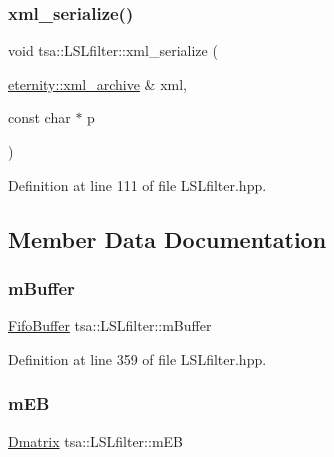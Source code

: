 \subsubsection{\texorpdfstring{xml\+\_\+serialize()}{xml\_serialize()}}
{\footnotesize\ttfamily void tsa\+::\+L\+S\+Lfilter\+::xml\+\_\+serialize (\begin{DoxyParamCaption}\item[{\hyperlink{classeternity_1_1xml__archive}{eternity\+::xml\+\_\+archive} \&}]{xml,  }\item[{const char $\ast$}]{p }\end{DoxyParamCaption})\hspace{0.3cm}{\ttfamily [inline]}}



Definition at line 111 of file L\+S\+Lfilter.\+hpp.



\subsection{Member Data Documentation}
\mbox{\label{classtsa_1_1_l_s_lfilter_a95e5134738dd70857cf6c7ac52b11639}} 
\subsubsection{\texorpdfstring{m\+Buffer}{mBuffer}}
{\footnotesize\ttfamily \hyperlink{classtsa_1_1_fifo_buffer}{Fifo\+Buffer} tsa\+::\+L\+S\+Lfilter\+::m\+Buffer\hspace{0.3cm}{\ttfamily [private]}}



Definition at line 359 of file L\+S\+Lfilter.\+hpp.

\mbox{\label{classtsa_1_1_l_s_lfilter_a24ad0a2f6a2b79b01b1e99ef9c663d1e}} 
\subsubsection{\texorpdfstring{m\+EB}{mEB}}
{\footnotesize\ttfamily \hyperlink{namespacetsa_ad260cd21c1891c4ed391fe788569aba4}{Dmatrix} tsa\+::\+L\+S\+Lfilter\+::m\+EB\hspace{0.3cm}{\ttfamily [private]}}

